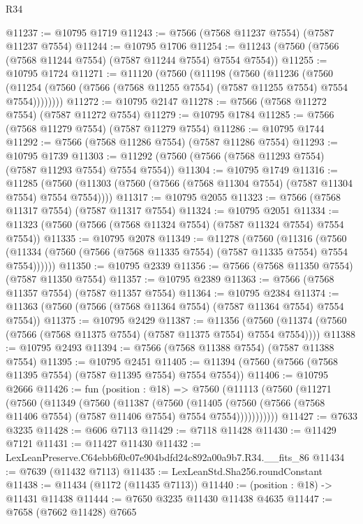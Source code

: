 \begin{lexlean}{R34}
\begin{coremodule}
@11237 := @10795 @1719
@11243 := @7566 (@7568 @11237 @7554) (@7587 @11237 @7554)
@11244 := @10795 @1706
@11254 := @11243 (@7560 (@7566 (@7568 @11244 @7554) (@7587 @11244 @7554) @7554 @7554))
@11255 := @10795 @1724
@11271 := @11120
    (@7560
      (@11198
        (@7560
          (@11236
            (@7560
              (@11254 (@7560 (@7566 (@7568 @11255 @7554) (@7587 @11255 @7554) @7554 @7554))))))))
@11272 := @10795 @2147
@11278 := @7566 (@7568 @11272 @7554) (@7587 @11272 @7554)
@11279 := @10795 @1784
@11285 := @7566 (@7568 @11279 @7554) (@7587 @11279 @7554)
@11286 := @10795 @1744
@11292 := @7566 (@7568 @11286 @7554) (@7587 @11286 @7554)
@11293 := @10795 @1739
@11303 := @11292 (@7560 (@7566 (@7568 @11293 @7554) (@7587 @11293 @7554) @7554 @7554))
@11304 := @10795 @1749
@11316 := @11285
    (@7560 (@11303 (@7560 (@7566 (@7568 @11304 @7554) (@7587 @11304 @7554) @7554 @7554))))
@11317 := @10795 @2055
@11323 := @7566 (@7568 @11317 @7554) (@7587 @11317 @7554)
@11324 := @10795 @2051
@11334 := @11323 (@7560 (@7566 (@7568 @11324 @7554) (@7587 @11324 @7554) @7554 @7554))
@11335 := @10795 @2078
@11349 := @11278
    (@7560
      (@11316
        (@7560 (@11334 (@7560 (@7566 (@7568 @11335 @7554) (@7587 @11335 @7554) @7554 @7554))))))
@11350 := @10795 @2339
@11356 := @7566 (@7568 @11350 @7554) (@7587 @11350 @7554)
@11357 := @10795 @2389
@11363 := @7566 (@7568 @11357 @7554) (@7587 @11357 @7554)
@11364 := @10795 @2384
@11374 := @11363 (@7560 (@7566 (@7568 @11364 @7554) (@7587 @11364 @7554) @7554 @7554))
@11375 := @10795 @2429
@11387 := @11356
    (@7560 (@11374 (@7560 (@7566 (@7568 @11375 @7554) (@7587 @11375 @7554) @7554 @7554))))
@11388 := @10795 @2493
@11394 := @7566 (@7568 @11388 @7554) (@7587 @11388 @7554)
@11395 := @10795 @2451
@11405 := @11394 (@7560 (@7566 (@7568 @11395 @7554) (@7587 @11395 @7554) @7554 @7554))
@11406 := @10795 @2666
@11426 := fun (position : @18) =>
  @7560
    (@11113
      (@7560
        (@11271
          (@7560
            (@11349
              (@7560
                (@11387
                  (@7560
                    (@11405
                      (@7560 (@7566 (@7568 @11406 @7554) (@7587 @11406 @7554) @7554 @7554)))))))))))
@11427 := @7633 @3235
@11428 := @606 @7113
@11429 := @7118 @11428
@11430 := @11429 @7121
@11431 := @11427 @11430
@11432 := LexLeanPreserve.C64ebb6f0c07e904bdfd24c892a00a9b7.R34.__fits_86
@11434 := @7639 (@11432 @7113)
@11435 := LexLeanStd.Sha256.roundConstant
@11438 := @11434 (@1172 (@11435 @7113))
@11440 := (position : @18) -> @11431 @11438
@11444 := @7650 @3235 @11430 @11438 @4635
@11447 := @7658 (@7662 @11428) @7665

\end{coremodule}
\end{lexlean}
